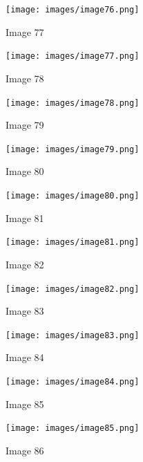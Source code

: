 \documentclass{article}%
\begin{document}
%


\begin{figure}[h!]%
\centering%
\texttt{[image: images/image76.png]}%
\caption{Image 77}%
\end{figure}

%


\begin{figure}[h!]%
\centering%
\texttt{[image: images/image77.png]}%
\caption{Image 78}%
\end{figure}

%


\begin{figure}[h!]%
\centering%
\texttt{[image: images/image78.png]}%
\caption{Image 79}%
\end{figure}

%


\begin{figure}[h!]%
\centering%
\texttt{[image: images/image79.png]}%
\caption{Image 80}%
\end{figure}

%


\begin{figure}[h!]%
\centering%
\texttt{[image: images/image80.png]}%
\caption{Image 81}%
\end{figure}

%


\begin{figure}[h!]%
\centering%
\texttt{[image: images/image81.png]}%
\caption{Image 82}%
\end{figure}

%


\begin{figure}[h!]%
\centering%
\texttt{[image: images/image82.png]}%
\caption{Image 83}%
\end{figure}

%


\begin{figure}[h!]%
\centering%
\texttt{[image: images/image83.png]}%
\caption{Image 84}%
\end{figure}

%


\begin{figure}[h!]%
\centering%
\texttt{[image: images/image84.png]}%
\caption{Image 85}%
\end{figure}

%


\begin{figure}[h!]%
\centering%
\texttt{[image: images/image85.png]}%
\caption{Image 86}%
\end{figure}
\end{document}
